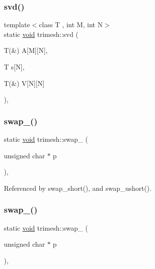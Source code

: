 \mbox{\label{namespacetrimesh_a6adde694d3ce031af879d34eab9c07db}} 
\subsubsection{\texorpdfstring{svd()}{svd()}}
{\footnotesize\ttfamily template$<$class T , int M, int N$>$ \\
static \hyperlink{namespacetrimesh_a784ddfd979e1c579bda795a8edfc3f43}{void} trimesh\+::svd (\begin{DoxyParamCaption}\item[{T(\&)}]{A\mbox{[}\+M\mbox{]}\mbox{[}\+N\mbox{]},  }\item[{T}]{s\mbox{[}\+N\mbox{]},  }\item[{T(\&)}]{V\mbox{[}\+N\mbox{]}\mbox{[}\+N\mbox{]} }\end{DoxyParamCaption})\hspace{0.3cm}{\ttfamily [inline]}, {\ttfamily [static]}}

\mbox{\label{namespacetrimesh_a604fb80fb02cb269a09340efecce38bc}} 
\subsubsection{\texorpdfstring{swap\+\_()}{swap\_16()}}
{\footnotesize\ttfamily static \hyperlink{namespacetrimesh_a784ddfd979e1c579bda795a8edfc3f43}{void} trimesh\+::swap\+\_ (\begin{DoxyParamCaption}\item[{unsigned char $\ast$}]{p }\end{DoxyParamCaption})\hspace{0.3cm}{\ttfamily [inline]}, {\ttfamily [static]}}



Referenced by swap\+\_\+short(), and swap\+\_\+ushort().

\mbox{\label{namespacetrimesh_ac0a8af760ad9653bed2fba73017582d2}} 
\subsubsection{\texorpdfstring{swap\+\_()}{swap\_32()}}
{\footnotesize\ttfamily static \hyperlink{namespacetrimesh_a784ddfd979e1c579bda795a8edfc3f43}{void} trimesh\+::swap\+\_ (\begin{DoxyParamCaption}\item[{unsigned char $\ast$}]{p }\end{DoxyParamCaption})\hspace{0.3cm}{\ttfamily [inline]}, {\ttfamily [static]}}



